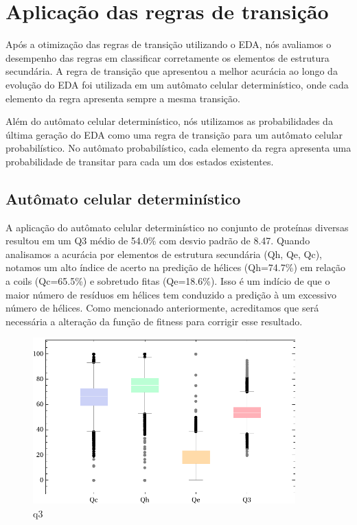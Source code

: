 \chapter{Aplicação das regras de transição}

Após a otimização das regras de transição utilizando o EDA, nós avaliamos o desempenho das regras em classificar corretamente os elementos de estrutura secundária. A regra de transição que apresentou a melhor acurácia ao longo da evolução do EDA foi utilizada em um autômato celular determinístico, onde cada elemento da regra apresenta sempre a mesma transição.

Além do autômato celular determinístico, nós utilizamos as probabilidades da última geração do EDA como uma regra de transição para um autômato celular probabilístico. No autômato probabilístico, cada elemento da regra apresenta uma probabilidade de transitar para cada um dos estados existentes.

\section{Autômato celular determinístico}

A aplicação do autômato celular determinístico no conjunto de proteínas diversas resultou em um Q3 médio de 54.0\% com desvio padrão de 8.47. Quando analisamos a acurácia por elementos de estrutura secundária (Qh, Qe, Qc), notamos um alto índice de acerto na predição de hélices (Qh=74.7\%) em relação a coils (Qc=65.5\%) e sobretudo fitas (Qe=18.6\%). Isso é um indício de que o maior número de resíduos em hélices tem conduzido a predição à um excessivo número de hélices. Como mencionado anteriormente, acreditamos que será necessária a alteração da função de fitness para corrigir esse resultado.

\begin{figure}
	\centering
	\includegraphics[width=0.9\textwidth]{figures/q3.pdf}
	\caption{q3}
	\label{fig:q3}
\end{figure}

